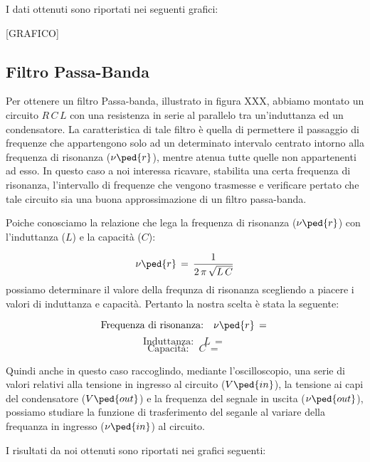 I dati ottenuti sono riportati nei seguenti grafici:

[GRAFICO]

\subsection*{Filtro Passa-Banda}

Per ottenere un filtro Passa-banda, illustrato in figura XXX, abbiamo montato un circuito $R\,C\,L$ con una resistenza in serie al parallelo tra un'induttanza ed un condensatore.
La caratteristica di tale filtro è quella di permettere il passaggio di frequenze che appartengono solo ad un determinato intervalo centrato intorno alla frequenza di risonanza ($\nu\ped{r}$), mentre atenua tutte quelle non appartenenti ad esso.
In questo caso a noi interessa ricavare, stabilita una certa frequenza di risonanza, l'intervallo di frequenze che vengono trasmesse e verificare pertato che tale circuito sia una buona approssimazione di un filtro passa-banda.

Poiche conosciamo la relazione che lega la frequenza di risonanza ($\nu\ped{r}$) con l'induttanza ($L$) e la capacità ($C$):

\begin{equation}
	\nu\ped{r} \,=\, \frac{1}{2\,\pi\,\sqrt{L\,C}}
	\label{eq:risonanza banda}
\end{equation}
%
possiamo determinare il valore della frequnza di risonanza scegliendo a piacere i valori di induttanza e capacità. Pertanto la nostra scelta è stata la seguente:

\begin{equation*}
	\text{Frequenza di risonanza:} \quad \nu\ped{r} \,=\,
\end{equation*}
\begin{equation*}
	\text{Induttanza:} \quad L \,=\,
\end{equation*}
\begin{equation*}
	\text{Capacità:} \quad C \,=\,
\end{equation*}

Quindi anche in questo caso raccoglindo, mediante l'oscilloscopio, una serie di valori relativi alla tensione in ingresso al circuito ($V\ped{in}$), la tensione ai capi del condensatore ($V\ped{out}$) e la frequenza del segnale in uscita ($\nu\ped{out}$), possiamo studiare la funzione di trasferimento del seganle al variare della frequanza in ingresso ($\nu\ped{in}$) al circuito.

I risultati da noi ottenuti sono riportati nei grafici seguenti:

